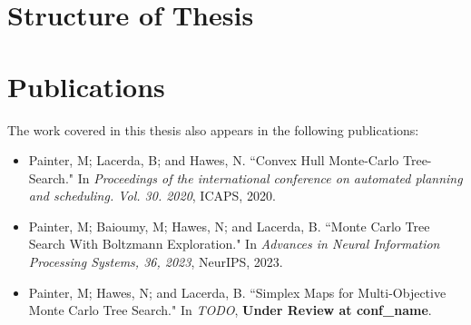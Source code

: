 


\section{Structure of Thesis}
\label{sec:1-3-thesis-structure}


\section{Publications}
\label{sec:1-4-publications}


    The work covered in this thesis also appears in the following publications:
    \begin{itemize}
        \item Painter, M; Lacerda, B; and Hawes, N. ``Convex Hull Monte-Carlo Tree-Search." In \textit{Proceedings of the international conference on automated planning and scheduling. Vol. 30. 2020}, ICAPS, 2020.
        \item Painter, M; Baioumy, M; Hawes, N; and Lacerda, B.  ``Monte Carlo Tree Search With Boltzmann Exploration." In \textit{Advances in Neural Information Processing Systems, 36, 2023}, NeurIPS, 2023.
        \item Painter, M; Hawes, N; and Lacerda, B. ``Simplex Maps for Multi-Objective Monte Carlo Tree Search." In \textit{TODO}, \textbf{Under Review at conf\_name}.
    \end{itemize}